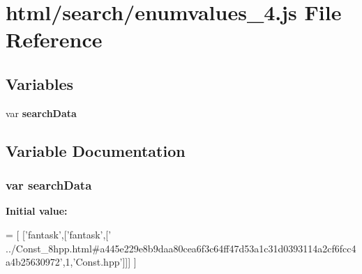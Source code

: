 \section{html/search/enumvalues\-\_\-4.js File Reference}
\label{enumvalues__4_8js}
\subsection*{Variables}
\begin{DoxyCompactItemize}
\item 
var {\bf search\-Data}
\end{DoxyCompactItemize}


\subsection{Variable Documentation}
\subsubsection[{search\-Data}]{\setlength{\rightskip}{0pt plus 5cm}var search\-Data}\label{enumvalues__4_8js_ad01a7523f103d6242ef9b0451861231e}
{\bfseries Initial value\-:}
\begin{DoxyCode}
=
[
  [\textcolor{stringliteral}{'fantask'},[\textcolor{stringliteral}{'fantask'},[\textcolor{stringliteral}{'
      ../Const\_8hpp.html#a445e229e8b9daa80cea6f3c64ff47d53a1c31d0393114a2cf6fcc4a4b25630972'},1,\textcolor{stringliteral}{'Const.hpp'}]]]
]
\end{DoxyCode}
